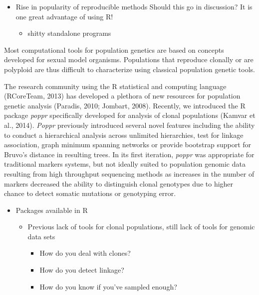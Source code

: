 \documentclass{frontiersSCNS} %
\begin{document}
\begin{itemize}
\itemsep1pt\parskip0pt
\item
  Rise in popularity of reproducible methods \textbar{} Should this go
  in discussion? It is one great advantage of using R!

  \begin{itemize}
  \itemsep1pt\parskip0pt
  \item
    shitty standalone programs
  \end{itemize}
\end{itemize}

Most computational tools for population genetics are based on concepts
developed for sexual model organisms. Populations that reproduce
clonally or are polyploid are thus difficult to characterize using
classical population genetic tools.

The research community using the R statistical and computing language
(RCoreTeam, 2013) has developed a plethora of new resources for
population genetic analysis (Paradis, 2010; Jombart, 2008). Recently, we
introduced the R package \emph{poppr} specifically developed for
analysis of clonal populations (Kamvar et al., 2014). \emph{Poppr}
previously introduced several novel features including the ability to
conduct a hierarchical analysis across unlimited hierarchies, test for
linkage association, graph minimum spanning networks or provide
bootstrap support for Bruvo's distance in resulting trees. In its first
iteration, \emph{poppr} was appropriate for traditional markers systems,
but not ideally suited to population genomic data resulting from high
throughput sequencing methods as increases in the number of markers
decreased the ability to distinguish clonal genotypes due to higher
chance to detect somatic mutations or genotyping error.

\begin{itemize}
\itemsep1pt\parskip0pt
\item
  Packages available in R

  \begin{itemize}
  \itemsep1pt\parskip0pt
  \item
    Previous lack of tools for clonal populations, still lack of tools
    for genomic data sets

    \begin{itemize}
    \itemsep1pt\parskip0pt
    \item
      How do you deal with clones?
    \item
      How do you detect linkage?
    \item
      How do you know if you've sampled enough?
    \end{itemize}
  \end{itemize}
\end{itemize}
\end{document}
